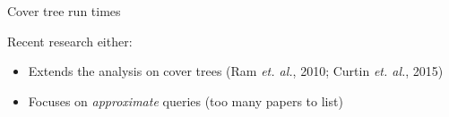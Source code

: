 \begin{frame}[fragile]{Cover tree run times}
%
%

\vspace{0.05in}
Recent research either:
\begin{itemize}
\item Extends the analysis on cover trees {\footnotesize (Ram \emph{et. al.}, 2010; Curtin \emph{et. al.}, 2015)}
\item Focuses on \emph{approximate} queries (too many papers to list)
\end{itemize}


\end{frame}

